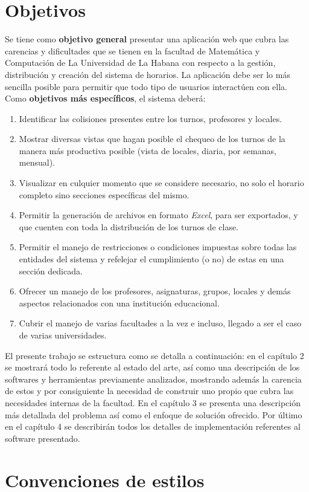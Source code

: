 \begin{introduction}
	\section{Objetivos}
	Se tiene como \textbf{objetivo general} presentar una aplicación web que cubra las carencias y dificultades que se tienen en la facultad de Matemática y Computación de La Universidad de La Habana con respecto a la gestión, distribución y creación del sistema de horarios. 
	La aplicación debe ser lo más sencilla posible para permitir que todo tipo de usuarios interactúen con ella. Como \textbf{objetivos más específicos}, el sistema deberá:
	\begin{enumerate}
		\item Identificar las colisiones presentes entre los turnos, profesores y locales.
		\item Mostrar diversas vistas que hagan posible el chequeo de los turnos de la manera más productiva posible (vista de locales, diaria, por semanas, mensual).
		\item Visualizar en culquier momento que se considere necesario, no solo el horario completo sino secciones específicas del mismo.
		\item Permitir la generación de archivos en formato \textit{Excel}, para ser exportados, y que cuenten con toda la distribución de los turnos de clase.
		\item Permitir el manejo de restricciones o condiciones impuestas sobre todas las entidades del sistema y refelejar el cumplimiento (o no) de estas en una sección dedicada.
		\item Ofrecer un manejo de los profesores, asignaturas, grupos, locales y demás aspectos relacionados con una institución educacional.
		\item Cubrir el manejo de varias facultades a la vez e incluso, llegado a ser el caso de varias universidades. 
	\end{enumerate}
	
	El presente trabajo se estructura como se detalla a continuación: en el capítulo 2 se mostrará todo lo referente al estado del arte, así como una descripción de los softwares y herramientas previamente analizados, mostrando además la carencia de estos y por consiguiente la necesidad de construir uno propio que cubra las necesidades internas de la facultad. En el capítulo 3 se presenta una descripción más detallada del problema así como el enfoque de solución ofrecido. Por último en el capítulo 4 se describirán todos los detalles de implementación referentes al software presentado.
	
	\section{Convenciones de estilos}

\end{introduction}
